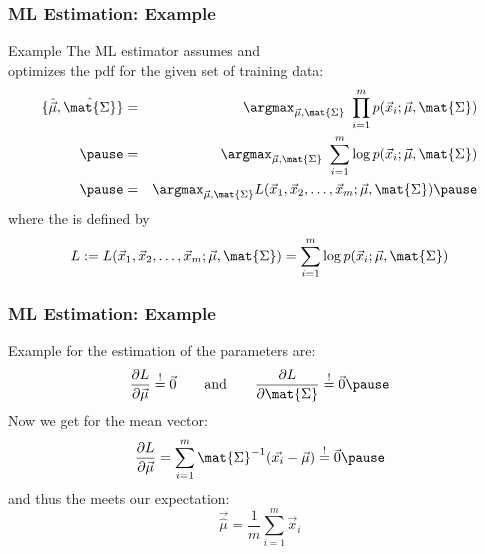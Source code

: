 \begin{frame}
  \frametitle{ML Estimation: Example \cont}

  \begin{ovalblock}{Example \cont}
    \small
    The ML estimator assumes  and \\
    optimizes the pdf for the given set of training data:
%
    {\footnotesize
      \begin{eqnarray*}
        \{\hat{\vec{\mu}}, \hat{\mat{\Sigma}}\}
          &=& \argmax_{\vec{\mu},\mat{\Sigma}}\ \prod_{i=1}^m p(\vec{x}_i;\vec{\mu}, \mat{\Sigma}) \\ \pause 
          &=& \argmax_{\vec{\mu},\mat{\Sigma}}\ \sum_{i=1}^m \log p(\vec{x}_i;\vec{\mu}, \mat{\Sigma}) \\ \pause
          &=& \argmax_{\vec{\mu},\mat{\Sigma}} L(\vec{x}_1, \vec{x}_2, \dots, \vec{x}_m; \vec{\mu}, \mat{\Sigma}) \pause
      \end{eqnarray*}
    }
%
    where the  is defined by
%
    {\footnotesize
      \begin{displaymath}
        L:= L(\vec{x}_1, \vec{x}_2, \dots, \vec{x}_m; \vec{\mu}, \mat{\Sigma}) =
        \sum_{i=1}^m \log p(\vec{x}_i;\vec{\mu}, \mat{\Sigma})
      \end{displaymath}
    }
    \vspace{-.25cm}
  \end{ovalblock}
\end{frame}


\begin{frame}
  \frametitle{ML Estimation: Example \cont}

  \begin{ovalblock}{Example \cont}
     \small
      for the estimation of the parameters are:
%
     {\footnotesize
       \begin{displaymath}
         \frac{\partial L}{\partial \vec{\mu}} \stackrel{!}{=} \vec{0} 
         \quad \quad \mbox{and} \quad \quad
         \frac{\partial L}{\partial \mat{\Sigma}} \stackrel{!}{=} \vec{0} \pause
       \end{displaymath}
     }
%
     Now we get for the mean vector:
%    
     {\footnotesize
       \begin{displaymath}
         \frac{\partial L}{\partial \vec{\mu}} = 
         \sum_{i=1}^m \mat{\Sigma}^{-1}(\vec{x_i}-\vec{\mu}) \stackrel{!}{=} 
         \vec{0} \pause
       \end{displaymath}
     }
%
     and thus the  meets our expectation:
%
     {\footnotesize
       \begin{displaymath}
         \vec{\hat{\mu}} = \frac{1}{m}\sum_{i=1}^m \vec{x}_i
      \end{displaymath}
    }
    \vspace{-.25cm}
  \end{ovalblock}
\end{frame}


